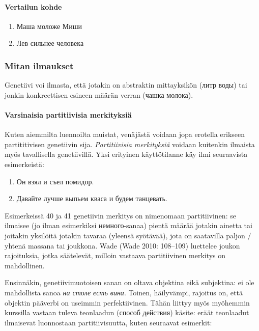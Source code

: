 \documentclass[]{scrartcl}
\providecommand{\tightlist}{%
  \setlength{\itemsep}{0pt}\setlength{\parskip}{0pt}}
\begin{document}
\paragraph{Vertailun kohde}\label{vertailun-kohde}

\begin{enumerate}
\def\labelenumi{(\arabic{enumi})}
\setcounter{enumi}{37}
\tightlist
\item
  Маша моложе Миши
\item
  Лев сильнее человека
\end{enumerate}

\subsubsection{Mitan ilmaukset}\label{mitan-ilmaukset}

Genetiivi voi ilmasta, että jotakin on abstraktin mittayksikön (литр
воды) tai jonkin konkreettisen esineen määrän verran (чашка молока).

\paragraph{Varsinaisia partitiivisia
merkityksiä}\label{varsinaisia-partitiivisia-merkityksiuxe4}

Kuten aiemmilta luennoilta muistat, venäjästä voidaan jopa erotella
erikseen partititivisen genetiivin sija. \emph{Partitiivisia
merkityksiä} voidaan kuitenkin ilmaista myös tavallisella genetiivillä.
Yksi erityinen käyttötilanne käy ilmi seuraavista esimerkeistä:

\begin{enumerate}
\def\labelenumi{(\arabic{enumi})}
\setcounter{enumi}{39}
\tightlist
\item
  Он взял и съел помидор.
\item
  Давайте лучше выпьем кваса и будем танцевать.
\end{enumerate}

Esimerkeissä 40 ja 41 genetiivin merkitys on nimenomaan partitiivinen:
se ilmaisee (jo ilman esimerkiksi немного-sanaa) pientä määrää jotakin
ainetta tai joitakin yksilöitä jotakin tavaraa (yleensä syötävää), jota
on saatavilla paljon / yhtenä massana tai joukkona. Wade (Wade 2010:
108--109) luettelee joukon rajoituksia, jotka säätelevät, milloin
vastaava partitiivinen merkitys on mahdollinen.

Ensinnäkin, genetiivimuotoisen sanan on oltava objektina eikä
subjektina: ei ole mahdollista sanoa \emph{на столе есть вина}. Toinen,
häilyvämpi, rajoitus on, että objektin pääverbi on useimmin
perfektiivinen. Tähän liittyy myös myöhemmin kurssilla vastaan tuleva
teonlaadun (способ действия) käsite: eräät teonlaadut ilmaisevat
luonnostaan partitiivisuutta, kuten seuraavat esimerkit:
\end{document}

